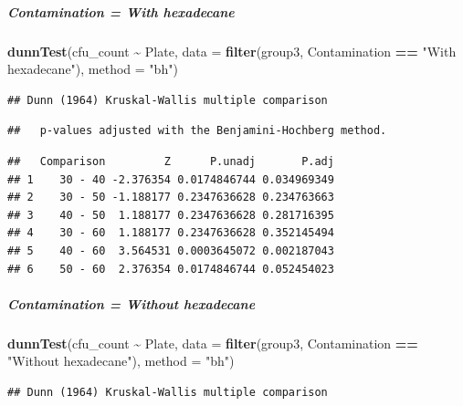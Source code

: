 \documentclass[
]{article}
\newenvironment{Shaded}{\begin{snugshade}}{\end{snugshade}}
\newcommand{\AttributeTok}[1]{\textcolor[rgb]{0.13,0.29,0.53}{#1}}
\newcommand{\FunctionTok}[1]{\textcolor[rgb]{0.13,0.29,0.53}{\textbf{#1}}}
\newcommand{\NormalTok}[1]{#1}
\newcommand{\SpecialCharTok}[1]{\textcolor[rgb]{0.81,0.36,0.00}{\textbf{#1}}}
\newcommand{\StringTok}[1]{\textcolor[rgb]{0.31,0.60,0.02}{#1}}
\begin{document}
\subparagraph{Contamination = With
hexadecane}\label{contamination-with-hexadecane-1}

\subparagraph{}\label{section-4}

\begin{Shaded}
\begin{Highlighting}[]
\FunctionTok{dunnTest}\NormalTok{(cfu\_count }\SpecialCharTok{\textasciitilde{}}\NormalTok{ Plate, }\AttributeTok{data =} \FunctionTok{filter}\NormalTok{(group3, Contamination }\SpecialCharTok{==} \StringTok{"With hexadecane"}\NormalTok{), }\AttributeTok{method =} \StringTok{"bh"}\NormalTok{)}
\end{Highlighting}
\end{Shaded}

\begin{verbatim}
## Dunn (1964) Kruskal-Wallis multiple comparison
\end{verbatim}

\begin{verbatim}
##   p-values adjusted with the Benjamini-Hochberg method.
\end{verbatim}

\begin{verbatim}
##   Comparison         Z      P.unadj       P.adj
## 1    30 - 40 -2.376354 0.0174846744 0.034969349
## 2    30 - 50 -1.188177 0.2347636628 0.234763663
## 3    40 - 50  1.188177 0.2347636628 0.281716395
## 4    30 - 60  1.188177 0.2347636628 0.352145494
## 5    40 - 60  3.564531 0.0003645072 0.002187043
## 6    50 - 60  2.376354 0.0174846744 0.052454023
\end{verbatim}

\subparagraph{Contamination = Without
hexadecane}\label{contamination-without-hexadecane-1}

\subparagraph{}\label{section-5}

\begin{Shaded}
\begin{Highlighting}[]
\FunctionTok{dunnTest}\NormalTok{(cfu\_count }\SpecialCharTok{\textasciitilde{}}\NormalTok{ Plate, }\AttributeTok{data =} \FunctionTok{filter}\NormalTok{(group3, Contamination }\SpecialCharTok{==} \StringTok{"Without hexadecane"}\NormalTok{), }\AttributeTok{method =} \StringTok{"bh"}\NormalTok{)}
\end{Highlighting}
\end{Shaded}

\begin{verbatim}
## Dunn (1964) Kruskal-Wallis multiple comparison
\end{verbatim}
\end{document}
